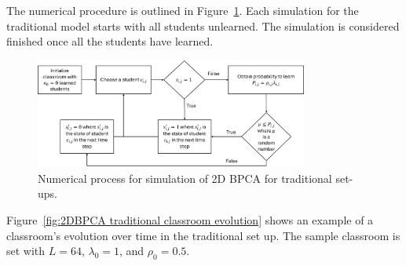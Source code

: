 The numerical procedure is outlined in Figure~\ref{fig:2DBPCA Traditional Flowchart}. Each simulation for the traditional model starts with all students unlearned. The simulation is considered finished once all the students have learned.

\begin{figure}[htbp!]
    \centering
    \includegraphics[width=0.8\textwidth]{figures/2DBPCA TI Flowchart.png}
    \caption[Traditional instruction simulation flowchart]{Numerical process for simulation of 2D BPCA for traditional set-ups.}
    \label{fig:2DBPCA Traditional Flowchart}
\end{figure}

Figure~\ref{fig:2DBPCA traditional classroom evolution} shows an example of a classroom's evolution over time in the traditional set up. The sample classroom is set with $L=64$, $\lambda_0 = 1$, and $\rho_0 = 0.5$.


